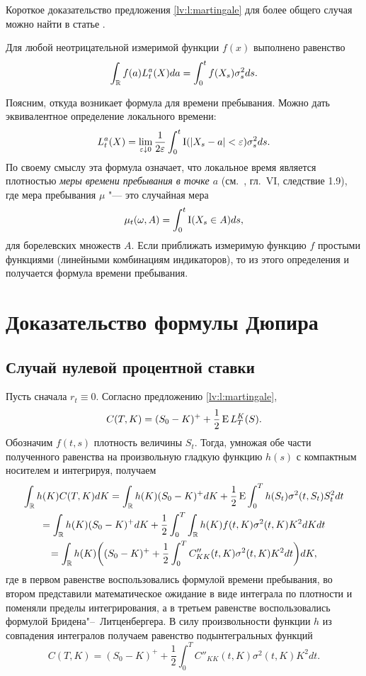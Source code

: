 Короткое доказательство предложения \ref{lv:l:martingale} для более общего случая можно найти в статье \cite{HamzaKlebaner22}. 


\begin{proposition}
Для любой неотрицательной измеримой функции $f(x)$ выполнено равенство
\[
\int_{\mathbb{R}} f(a) L_t^a(X) da = \int_0^t f(X_s) \sigma_s^2 ds.
\]  
\end{proposition}

\begin{remark}
Поясним, откуда возникает формула для времени пребывания.
Можно дать эквивалентное определение локального времени:
\[
L_t^a(X) = \lim_{\varepsilon\downarrow 0} \frac{1}{2\varepsilon} \int_0^t \operatorname{I}(|X_s-a|< \varepsilon) \sigma^2_s ds.
\]
По своему смыслу эта формула означает, что локальное время является плотностью \emph{меры времени пребывания в точке $a$} (см.~\cite{RevuzYor}, гл.~VI, следствие 1.9), где мера пребывания $\mu$ "--- это случайная мера 
\[
\mu_t(\omega, A) = \int_0^t \operatorname{I}(X_s \in A) ds,
\] 
для борелевских множеств $A$.
Если приближать измеримую функцию $f$ простыми функциями (линейными комбинациям индикаторов), то из этого определения и получается формула времени пребывания.
\end{remark}


\section{Доказательство формулы Дюпира}
\subsection{Случай нулевой процентной ставки}

Пусть сначала $r_t\equiv 0$.
Согласно предложению \ref{lv:l:martingale}, 
\[
C(T,K) = (S_0-K)^+ + \frac 12 \operatorname{E} L_T^K(S).
\]
Обозначим $f(t,s)$ плотность величины $S_t$.
Тогда, умножая обе части полученного равенства на произвольную гладкую функцию $h(s)$ с компактным носителем и интегрируя, получаем
\begin{multline*}
\int_{\mathbb{R}} h(K) C(T,K) dK 
= \int_{\mathbb{R}} h(K)(S_0-K)^+  dK + \frac12 \operatorname{E} \int_0^T h(S_t) \sigma^2(t,S_t) S_t^2 dt \\
=\int_{\mathbb{R}} h(K)(S_0-K)^+  dK + \frac12 \int_0^T \int_{\mathbb{R}} h(K)f(t,K) \sigma^2(t,K)K^2 dK dt \\
= \int_{\mathbb{R}} h(K) 
  \biggl(
    (S_0-K)^+ + \frac12\int_0^T C''_{KK}(t,K) \sigma^2(t,K)K^2 dt
  \biggr) dK,
\end{multline*}
где в первом равенстве воспользовались формулой времени пребывания, во втором представили математическое ожидание в виде интеграла по плотности и поменяли пределы интегрирования, а в третьем равенстве воспользовались формулой Бридена"--~Литценбергера.
В силу произвольности функции $h$ из совпадения интегралов получаем равенство подынтегральных функций
\[
C(T,K) = (S_0-K)^+ + \frac12 \int_0^T C''_{KK}(t,K) \sigma^2(t,K) K^2dt.
\]

